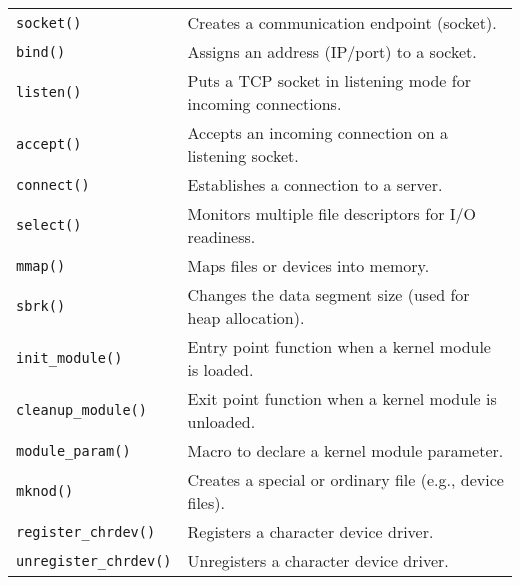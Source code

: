 \documentclass[openany,12pt]{book}
\newcommand{\code}[1]{\texttt{#1}}
\begin{document}
\begin{longtable}{|>{\raggedright\arraybackslash}p{3.5cm}|>{\raggedright\arraybackslash}p{11.5cm}|}
  \hline
  \code{socket()}   & Creates a communication endpoint (socket).                                                        \\
  \code{bind()}     & Assigns an address (IP/port) to a socket.                                                         \\
  \code{listen()}   & Puts a TCP socket in listening mode for incoming connections.                                     \\
  \code{accept()}   & Accepts an incoming connection on a listening socket.                                             \\
  \code{connect()}  & Establishes a connection to a server.                                                             \\
  \code{select()}   & Monitors multiple file descriptors for I/O readiness.                                             \\
  \hline
  \code{mmap()}     & Maps files or devices into memory.                                                                \\
  \code{sbrk()}     & Changes the data segment size (used for heap allocation).                                         \\
  \hline
  \code{init\_module()} & Entry point function when a kernel module is loaded.                                          \\
  \code{cleanup\_module()} & Exit point function when a kernel module is unloaded.                                         \\
  \code{module\_param()} & Macro to declare a kernel module parameter.                                                     \\
  \code{mknod()}    & Creates a special or ordinary file (e.g., device files).                                          \\
  \code{register\_chrdev()} & Registers a character device driver.                                                        \\
  \code{unregister\_chrdev()} & Unregisters a character device driver.                                                      \\
  \hline
\end{longtable}
\end{document}
